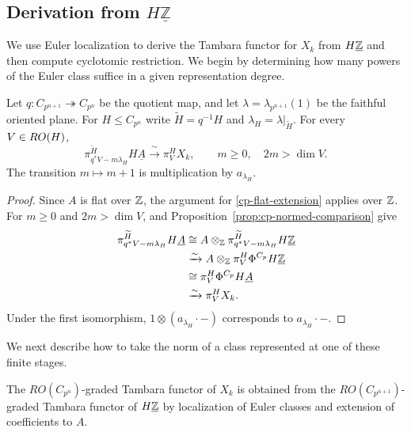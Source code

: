 \subsection{Derivation from $H\underline{\mathbb{Z}}$}

We use Euler localization to derive the Tambara functor for $X_k$ from $H\underline{\mathbb Z}$ and then compute cyclotomic restriction. We begin by determining how many powers of the Euler
class suffice in a given representation degree.

\begin{proposition}\label{lem:cp-stabilization}
Let $q:C_{p^{n+1}}\twoheadrightarrow C_{p^n}$ be the quotient map, and
let $\lambda=\lambda_{p^{n+1}}(1)$ be the faithful oriented plane.
For $H\leq C_{p^n}$ write $\widetilde H=q^{-1}H$ and
$\lambda_H=\lambda|_{\widetilde H}$.  For every $V\in RO(H)$,
\begin{equation}\label{cp-euler-bound}
 \pi_{q^*V-m\lambda_H}^{\widetilde H}H\underline A
       \xrightarrow{\ \sim\ }\pi_V^H X_k,
 \qquad m\geq0,\quad 2m>\dim V.
\end{equation}
The transition $m\mapsto m+1$ is multiplication by $a_{\lambda_H}$.
\end{proposition}
\begin{proof}
Since $A$ is flat over $\mathbb Z$, the argument for
\eqref{cp-flat-extension} applies over $\mathbb Z$.
For $m\ge0$ and $2m>\dim V$,
\cite[Section~1, p.~3]{ZhangHZ} and
Proposition~\ref{prop:cp-normed-comparison} give
\[
\begin{aligned}
\pi_{q^*V-m\lambda_H}^{\widetilde H}H\underline A
&\cong
A\otimes_{\mathbb Z}
\pi_{q^*V-m\lambda_H}^{\widetilde H}H\underline{\mathbb Z}\\
&\xrightarrow{\sim}
A\otimes_{\mathbb Z}\pi_V^H\Phi^{C_p}H\underline{\mathbb Z}\\
&\cong
\pi_V^H\Phi^{C_p}H\underline A\\
&\xrightarrow{\sim}
\pi_V^H X_k.
\end{aligned}
\]
Under the first isomorphism,
$1\otimes(a_{\lambda_H}\cdot-)$ corresponds to
$a_{\lambda_H}\cdot-$.
\end{proof}

We next describe how to take the norm of a class represented at one of
these finite stages.

\begin{proposition}\label{prop:cp-induced}
The $RO(C_{p^n})$-graded Tambara functor of $X_k$ is obtained
from the $RO(C_{p^{n+1}})$-graded Tambara functor of $H\underline{\mathbb Z}$ by localization of Euler classes and extension of
coefficients to $A$.
\end{proposition}

